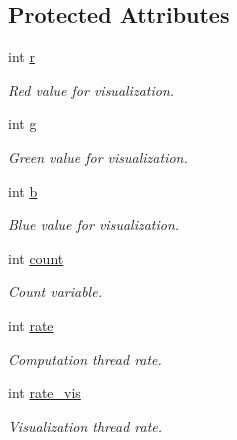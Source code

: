 \subsection*{Protected Attributes}
\begin{DoxyCompactItemize}
\item 
\mbox{\label{classSuperqModule_ada2b94883ea2a69f9fab8cb045a5a138}} 
int \mbox{\hyperlink{classSuperqModule_ada2b94883ea2a69f9fab8cb045a5a138}{r}}
\begin{DoxyCompactList}\small\item\em Red value for visualization. \end{DoxyCompactList}\item 
\mbox{\label{classSuperqModule_a1d40ba1a934cd176b0365116597814da}} 
int \mbox{\hyperlink{classSuperqModule_a1d40ba1a934cd176b0365116597814da}{g}}
\begin{DoxyCompactList}\small\item\em Green value for visualization. \end{DoxyCompactList}\item 
\mbox{\label{classSuperqModule_a048daff404a4f8d8dd83072f5e7675cd}} 
int \mbox{\hyperlink{classSuperqModule_a048daff404a4f8d8dd83072f5e7675cd}{b}}
\begin{DoxyCompactList}\small\item\em Blue value for visualization. \end{DoxyCompactList}\item 
\mbox{\label{classSuperqModule_a4fbfa7613a6f89c61454b61acf288b9f}} 
int \mbox{\hyperlink{classSuperqModule_a4fbfa7613a6f89c61454b61acf288b9f}{count}}
\begin{DoxyCompactList}\small\item\em Count variable. \end{DoxyCompactList}\item 
\mbox{\label{classSuperqModule_aa778e1c9f9b6627b72bafe1c45e097b9}} 
int \mbox{\hyperlink{classSuperqModule_aa778e1c9f9b6627b72bafe1c45e097b9}{rate}}
\begin{DoxyCompactList}\small\item\em Computation thread rate. \end{DoxyCompactList}\item 
\mbox{\label{classSuperqModule_ad0dab1b5c69a32f877eac1ca745a0cbc}} 
int \mbox{\hyperlink{classSuperqModule_ad0dab1b5c69a32f877eac1ca745a0cbc}{rate\+\_\+vis}}
\begin{DoxyCompactList}\small\item\em Visualization thread rate. \end{DoxyCompactList}\item 

\end{DoxyCompactItemize}
